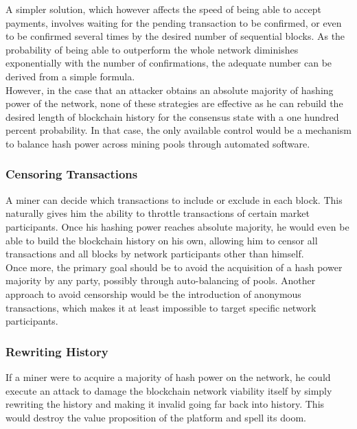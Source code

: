 \documentclass[11pt,a4paper,draft]{article}
\begin{document}
A simpler solution, which however affects the speed of being able to accept payments, involves waiting for the pending transaction to be confirmed, or even to be confirmed several times by the desired number of sequential blocks. As the probability of being able to outperform the whole network diminishes exponentially with the number of confirmations, the adequate number can be derived from a simple formula.\\

However, in the case that an attacker obtains an absolute majority of hashing power of the network, none of these strategies are effective as he can rebuild the desired length of blockchain history for the consensus state with a one hundred percent probability. In that case, the only available control would be a mechanism to balance hash power across mining pools through automated software.\\

\subsubsection{Censoring Transactions}

A miner can decide which transactions to include or exclude in each block. This naturally gives him the ability to throttle transactions of certain market participants. Once his hashing power reaches absolute majority, he would even be able to build the blockchain history on his own, allowing him to censor all transactions and all blocks by network participants other than himself.\\

Once more, the primary goal should be to avoid the acquisition of a hash power majority by any party, possibly through auto-balancing of pools. Another approach to avoid censorship would be the introduction of anonymous transactions, which makes it at least impossible to target specific network participants.\\

\subsubsection{Rewriting History}

If a miner were to acquire a majority of hash power on the network, he could execute an attack to damage the blockchain network viability itself by simply rewriting the history and making it invalid going far back into history. This would destroy the value proposition of the platform and spell its doom.\\
\end{document}
